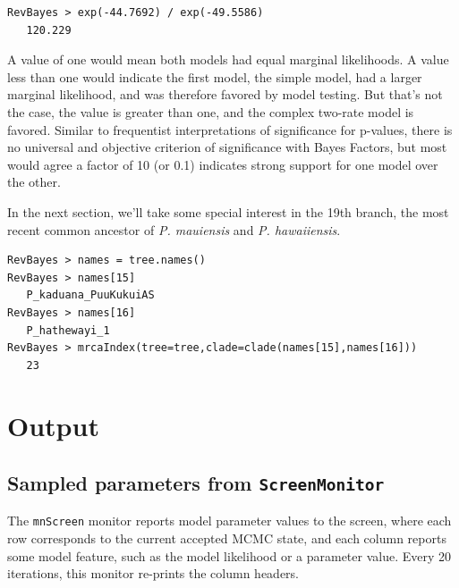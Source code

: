 \documentclass[11pt]{article}
\begin{document}
\begin{snugshade}
\begin{lstlisting}
RevBayes > exp(-44.7692) / exp(-49.5586)
   120.229
\end{lstlisting}
\end{snugshade}

A value of one would mean both models had equal marginal likelihoods.
A value less than one would indicate the first model, the simple model, had a larger marginal likelihood, and was therefore favored by model testing.
But that's not the case, the value is greater than one, and the complex two-rate model is favored.
Similar to frequentist interpretations of significance for p-values, there is no universal and objective criterion of significance with Bayes Factors, but most would agree a factor of 10 (or 0.1) indicates strong support for one model over the other.

In the next section, we'll take some special interest in the 19th branch, the most recent common ancestor of {\it P. mauiensis} and {\it P. hawaiiensis}.
\begin{snugshade}
\begin{lstlisting}
RevBayes > names = tree.names()
RevBayes > names[15]
   P_kaduana_PuuKukuiAS
RevBayes > names[16]
   P_hathewayi_1
RevBayes > mrcaIndex(tree=tree,clade=clade(names[15],names[16]))
   23
\end{lstlisting}
\end{snugshade}

\section{Output}

\subsection{Sampled parameters from {\tt ScreenMonitor}}

The {\tt mnScreen} monitor reports model parameter values to the screen, where each row corresponds to the current accepted MCMC state, and each column reports some model feature, such as the model likelihood or a parameter value.
Every 20 iterations, this monitor re-prints the column headers.
\end{document}
